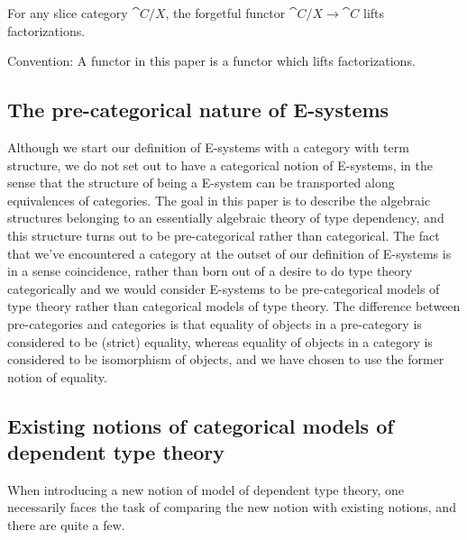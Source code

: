 \begin{eg}
For any slice category $\cat{C}/X$, the forgetful functor $\cat{C}/X\to\cat{C}$
lifts factorizations.
\end{eg}

Convention: A functor in this paper is a functor which lifts factorizations.

\subsection*{The pre-categorical nature of E-systems}
Although we start our definition of E-systems with a category with term structure,
we do not set out to have a categorical notion of E-systems, in the sense that the structure of
being a E-system can be transported along equivalences of categories. The goal
in this paper is to describe the algebraic structures belonging to an essentially
algebraic theory of type dependency, and this structure turns out to be pre-categorical
rather than categorical. The fact that we've encountered a category at the outset
of our definition of E-systems is in a sense coincidence, rather than born out
of a desire to do type theory categorically and we would consider E-systems to
be pre-categorical models of type theory rather than categorical models of type
theory. The difference between pre-categories and categories is that equality
of objects in a pre-category is considered to be (strict) equality, whereas
equality of objects in a category is considered to be isomorphism of objects,
and we have chosen to use the former notion of equality.

\subsection*{Existing notions of categorical models of dependent type theory}

When introducing a new notion of model of dependent type theory, one necessarily
faces the task of comparing the new notion with existing notions, and there are
quite a few. 

